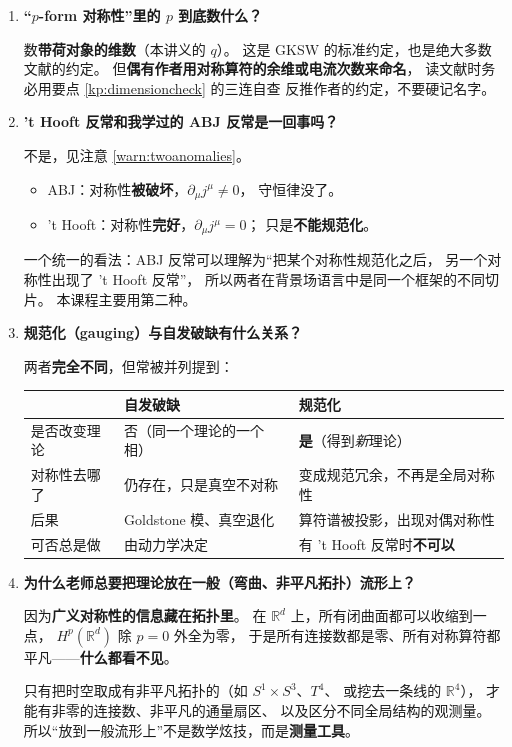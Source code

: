 \documentclass[UTF8,a4paper,11pt]{ctexart}
\theoremstyle{plain}
\theoremstyle{definition}
\theoremstyle{remark}
\newcommand{\RR}{\mathbb{R}}
\begin{document}
\begin{enumerate}[label=\textbf{Q\arabic*.},ref=\arabic*,leftmargin=1.3cm]
\item \textbf{“$p$-form 对称性”里的 $p$ 到底数什么？}
\label{q:whichp}

数\textbf{带荷对象的维数}（本讲义的 $q$）。
这是 GKSW 的标准约定，也是绝大多数文献的约定。
但\textbf{偶有作者用对称算符的余维或电流次数来命名}，
读文献时务必用要点 \ref{kp:dimensioncheck} 的三连自查
反推作者的约定，不要硬记名字。

\item \textbf{'t Hooft 反常和我学过的 ABJ 反常是一回事吗？}
\label{q:anomalykinds}

不是，见注意 \ref{warn:twoanomalies}。
\begin{itemize}
  \item ABJ：对称性\textbf{被破坏}，$\partial_\mu j^\mu\ne0$，
        守恒律没了。
  \item 't Hooft：对称性\textbf{完好}，$\partial_\mu j^\mu=0$；
        只是\textbf{不能规范化}。
\end{itemize}
一个统一的看法：ABJ 反常可以理解为“把某个对称性规范化之后，
另一个对称性出现了 't Hooft 反常”，
所以两者在背景场语言中是同一个框架的不同切片。
本课程主要用第二种。

\item \textbf{规范化（gauging）与自发破缺有什么关系？}
\label{q:gauge-vs-ssb}

两者\textbf{完全不同}，但常被并列提到：
\begin{center}
\begin{tabular}{@{}lll@{}}
\toprule
 & 自发破缺 & 规范化 \\
\midrule
是否改变理论 & 否（同一个理论的一个相） & \textbf{是}（得到\emph{新}理论） \\
对称性去哪了 & 仍存在，只是真空不对称 & 变成规范冗余，不再是全局对称性 \\
后果 & Goldstone 模、真空退化 & 算符谱被投影，出现对偶对称性 \\
可否总是做 & 由动力学决定 & 有 't Hooft 反常时\textbf{不可以} \\
\bottomrule
\end{tabular}
\end{center}

\item \textbf{为什么老师总要把理论放在一般（弯曲、非平凡拓扑）流形上？}
\label{q:manifold}

因为\textbf{广义对称性的信息藏在拓扑里}。
在 $\RR^d$ 上，所有闭曲面都可以收缩到一点，
$H^p(\RR^d)$ 除 $p=0$ 外全为零，
于是所有连接数都是零、所有对称算符都平凡——\textbf{什么都看不见}。

只有把时空取成有非平凡拓扑的（如 $S^1\times S^3$、$T^4$、
或挖去一条线的 $\RR^4$），
才能有非零的连接数、非平凡的通量扇区、
以及区分不同全局结构的观测量。
所以“放到一般流形上”不是数学炫技，而是\textbf{测量工具}。

\end{enumerate}
\end{document}
